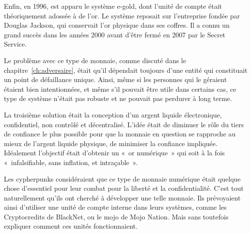 Enfin, en 1996, est apparu le système e-gold, dont l'unité de compte était théoriquement adossée à de l'or. Le système reposait sur l'entreprise  fondée par Douglas Jackson, qui conservait l'or physique dans ses coffres. Il a connu un grand succès dans les années 2000 avant d'être fermé en 2007 par le Secret Service.

Le problème avec ce type de monnaie, comme discuté dans le chapitre~\ref{ch:adversaire}, était qu'il dépendait toujours d'une entité qui constituait un point de défaillance unique. Ainsi, même si les personnes qui le géraient étaient bien intentionnées, et même s'il pouvait être utile dans certains cas, ce type de système n'était pas robuste et ne pouvait pas perdurer à long terme.


La troisième solution était la conception d'un argent liquide électronique, confidentiel, non contrôlé et décentralisé. L'idée était de diminuer le rôle du tiers de confiance le plus possible pour que la monnaie en question se rapproche au mieux de l'argent liquide physique, de minimiser la confiance impliquée. Idéalement l'objectif était d'obtenir un «~or numérique~» qui soit à la fois «~infalsifiable, sans inflation, et intraçable~». %

Les cypherpunks considéraient que ce type de monnaie numérique était quelque chose d'essentiel pour leur combat pour la liberté et la confidentialité. C'est tout naturellement qu'ils ont cherché à développer une telle monnaie. Ils prévoyaient ainsi d'utiliser une unité de compte interne dans leurs systèmes, comme les Cryptocredits de BlackNet, ou le mojo de Mojo Nation. Mais sans toutefois expliquer comment ces unités fonctionnaient.

